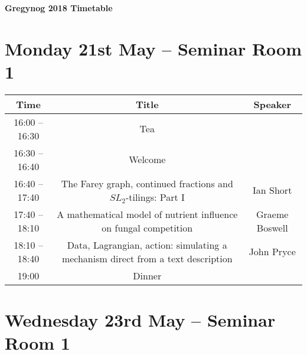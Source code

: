 \documentclass{article}
\begin{document}
\begin{center}
 \textbf{\Huge Gregynog 2018 Timetable}
\end{center}


\section*{Monday 21st May -- Seminar Room 1}

\begin{center}
 \begin{table}[h!]
  \centering
  \begin{tabular}{c | c | c}
   \toprule
   \textbf{Time} & \textbf{Title} & \textbf{Speaker} \\
   \midrule
    16:00 -- 16:30 & \cellcolor{blue!25}Tea & \\
   \midrule
    16:30 -- 16:40 & Welcome & \\
   \midrule
    16:40 -- 17:40 & The Farey graph, continued fractions and $SL_2$-tilings: Part I & Ian Short \\
   \midrule
    17:40 -- 18:10 & A mathematical model of nutrient influence on fungal competition & Graeme Boswell \\
   \midrule
    18:10 -- 18:40 & Data, Lagrangian, action: simulating a mechanism direct from a text description & John Pryce \\
   \midrule
    19:00 & \cellcolor{blue!25}Dinner & \\   
   \bottomrule
  \end{tabular}
 \end{table}
\end{center}



\section*{Wednesday 23rd May -- Seminar Room 1}
\end{document}

